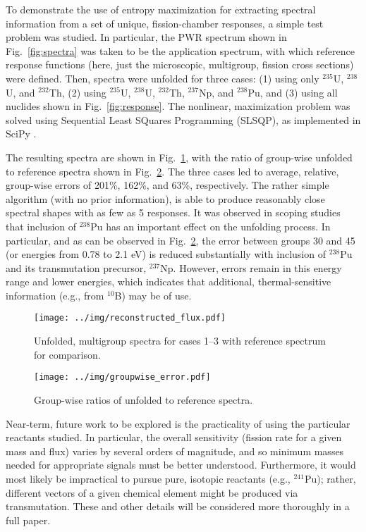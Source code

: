 \documentclass[journal]{IEEEtran}
\newcommand{\FIG}[1]{Fig.~\ref{#1}}               %
\begin{document}
To demonstrate the use of entropy maximization for extracting spectral information from a set of unique, fission-chamber responses,  a simple test problem was studied.  In particular, the PWR spectrum shown in \FIG{fig:spectra} was taken to be the application spectrum, with which reference response functions (here, just the microscopic, multigroup, fission cross sections) were defined.  Then, spectra were unfolded for three cases: (1) using only ${}^{235}$U, ${}^{238}$U, and ${}^{232}$Th, (2) using  ${}^{235}$U, ${}^{238}$U, ${}^{232}$Th, ${}^{237}$Np, and ${}^{238}$Pu, and (3) using all nuclides shown in \FIG{fig:response}.  
The nonlinear, maximization problem was solved using Sequential Least SQuares Programming (SLSQP), as implemented in SciPy \cite{scipy}.

The resulting spectra are shown in \FIG{fig:unfolded_spectra}, with the ratio of group-wise unfolded to reference spectra shown in \FIG{fig:error}. The three cases led to average, relative, group-wise errors of 201\%, 162\%, and 63\%, respectively.   The rather simple algorithm (with no prior information), is able to produce reasonably close spectral shapes with as few as 5 responses.  It was observed in scoping studies that inclusion of ${}^{238}$Pu has an important effect on the unfolding process.  In particular, and as can be observed in \FIG{fig:error}, the error between groups 30 and 45 (or energies from 0.78 to 2.1 eV) is reduced substantially with inclusion of ${}^{238}$Pu and its transmutation precursor, ${}^{237}$Np.  However, errors remain in this energy range and lower energies, which indicates that additional, thermal-sensitive information (e.g., from ${}^{10}$B) may be of use.

\begin{figure}[h!tb]
  \centering
  \texttt{[image: ../img/reconstructed\_flux.pdf]}
  \caption{Unfolded, multigroup spectra for cases 1--3 with reference spectrum for comparison.}
  \label{fig:unfolded_spectra}
\end{figure}

\begin{figure}[h!tb]
  \centering
  \texttt{[image: ../img/groupwise\_error.pdf]}
  \caption{Group-wise ratios of unfolded to 
  reference spectra.}
  \label{fig:error}
\end{figure}

Near-term, future work to be explored is the practicality of using the particular reactants studied.  In particular, the overall sensitivity (fission rate for a given mass and flux) varies by several orders of magnitude, and so minimum masses needed for appropriate signals must be better understood.  Furthermore, it would most likely be impractical to pursue pure, isotopic reactants (e.g., ${}^{241}$Pu); rather, different vectors of a given chemical element might be produced via transmutation.  These and other details will be considered more thoroughly in a full paper.
\end{document}
